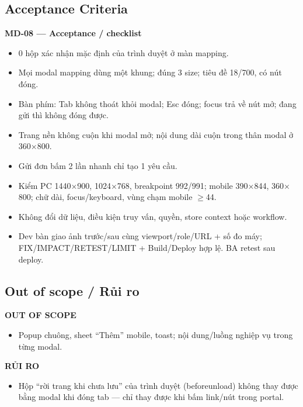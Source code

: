 \documentclass[11pt,a4paper]{report}
\begin{document}
\subsection*{Acceptance Criteria}
\par\smallskip\textbf{MD-08 — Acceptance / checklist}\par
\begin{itemize}[label=$\square$]
\item 0 hộp xác nhận mặc định của trình duyệt ở màn mapping.
\item Mọi modal mapping dùng một khung; đúng 3 size; tiêu đề 18/\allowbreak{}700, có nút đóng.
\item Bàn phím: Tab không thoát khỏi modal; Esc đóng; focus trả về nút mở; đang gửi thì không đóng được.
\item Trang nền không cuộn khi modal mở; nội dung dài cuộn trong thân modal ở 360\(\times\)800.
\item Gửi đơn bấm 2 lần nhanh chỉ tạo 1 yêu cầu.
\item Kiểm PC 1440\(\times\)900, 1024\(\times\)768, breakpoint 992/\allowbreak{}991; mobile 390\(\times\)844, 360\(\times\)800; chữ dài, focus/\allowbreak{}keyboard, vùng chạm mobile \(\geq\)44.
\item Không đổi dữ liệu, điều kiện truy vấn, quyền, store context hoặc workflow.
\item Dev bàn giao ảnh trước/\allowbreak{}sau cùng viewport/\allowbreak{}role/\allowbreak{}URL + số đo máy; FIX/\allowbreak{}IMPACT/\allowbreak{}RETEST/\allowbreak{}LIMIT + Build/\allowbreak{}Deploy hợp lệ. BA retest sau deploy.
\end{itemize}
\subsection*{Out of scope / Rủi ro}
\par\smallskip\textbf{OUT OF SCOPE}\par
\begin{itemize}
\item Popup chuông, sheet “Thêm” mobile, toast; nội dung/\allowbreak{}luồng nghiệp vụ trong từng modal.
\end{itemize}

\par\smallskip\textbf{RỦI RO}\par
\begin{itemize}
\item Hộp “rời trang khi chưa lưu” của trình duyệt (beforeunload) không thay được bằng modal khi đóng tab — chỉ thay được khi bấm link/\allowbreak{}nút trong portal.
\end{itemize}
\end{document}
